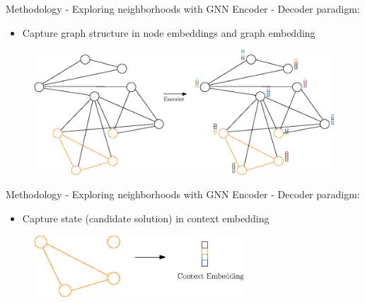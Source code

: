 \documentclass{beamer}
\begin{document}
\begin{frame}{Methodology - Exploring neighborhoods with GNN}
Encoder - Decoder paradigm: 
    \begin{itemize}
            \item Capture graph structure in node embeddings and graph embedding
    \end{itemize}
    \begin{figure}
        \centering
        \includegraphics[width=1.0\textwidth]{graphics/graph-encoder.eps}
    \end{figure}
\end{frame}

\begin{frame}{Methodology - Exploring neighborhoods with GNN}
Encoder - Decoder paradigm: 
    \begin{itemize}
            \item Capture state (candidate solution) in context embedding
    \end{itemize}
    \begin{figure}
        \centering
        \includegraphics[width=0.7\textwidth]{graphics/graph-state.eps}
    \end{figure}
\end{frame}
\end{document}
